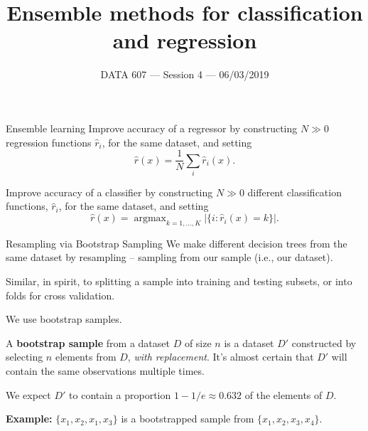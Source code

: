 \documentclass{beamer}
\DeclareMathOperator*{\Argmax}{argmax}
\begin{document}
    
\setlength{\parskip}{1em}
\begin{frame}
    \title{Ensemble methods for classification and regression}
    \date{DATA 607 --- Session 4 --- 06/03/2019}
    \maketitle
\end{frame}

\begin{frame}{Ensemble learning}
    Improve accuracy of a regressor by constructing $N \gg 0$ regression functions $\hat{r}_i$, for the same dataset, and setting
    \[
        \hat r(x) = \frac1N\sum_i\hat r_i(x).
    \]

    Improve accuracy of a classifier by constructing $N \gg 0$ different classification functions, $\hat r_i$, for the same dataset, and setting
    \[
        \hat r(x) = \Argmax_{k=1,\ldots,K} \big|\{i : \hat r_i(x) = k\}\big|.
    \]
\end{frame}

\begin{frame}{Resampling via Bootstrap Sampling}
    We make different decision trees from the same dataset by resampling --
    sampling from our sample (i.e., our dataset).

    Similar, in spirit, to splitting a sample into training and testing subsets,
    or into folds for cross validation.

    We use bootstrap samples.

    A \textbf{bootstrap sample} from a dataset $D$ of size $n$ is a dataset $D'$ constructed by
    selecting $n$ elements from $D$, \emph{with replacement}.
    It's almost certain that $D'$ will contain the same observations multiple times.

    We expect $D'$ to contain a proportion $1-1/e\approx 0.632$ of the elements of $D$.

    \textbf{Example:} $\{x_1, x_2, x_1, x_3\}$ is a bootstrapped sample from $\{x_1, x_2, x_3, x_4\}$.
\end{frame}
\end{document}
